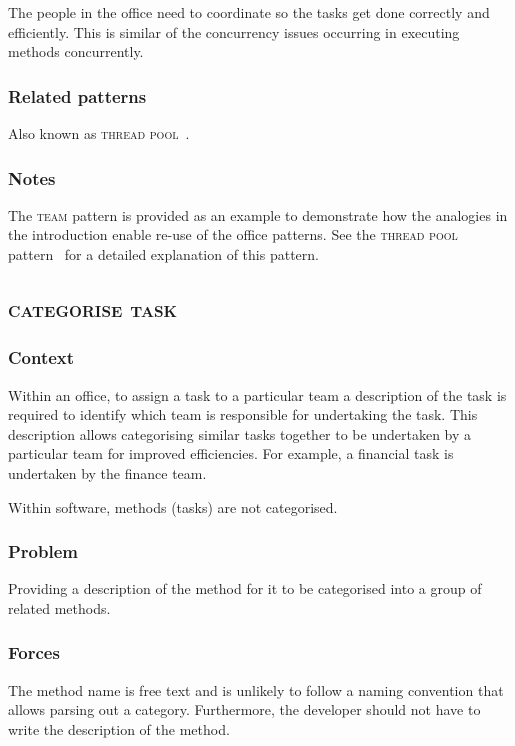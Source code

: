 \documentclass[prodmode]{style/acmlarge}
\begin{document}
The people in the office need to coordinate so the tasks get done correctly and
efficiently.  This is similar of the concurrency issues occurring in executing
methods concurrently.

\subsubsection*{Related patterns} Also known as \textsc{thread pool}~\cite{thread-per-request}.

\subsubsection*{Notes} The \textsc{team} pattern is provided as an example to
demonstrate how the analogies in the introduction enable re-use of the office
patterns. See the \textsc{thread pool} pattern~\cite{thread-per-request} for a
detailed explanation of this pattern.



\subsection{\textsc{\textbf{categorise task}}}

\subsubsection*{Context} Within an office, to assign a task to a particular team
a description of the task is required to identify which team is responsible for
undertaking the task.  This description allows categorising similar tasks
together to be undertaken by a particular team for improved efficiencies.  For
example, a financial task is undertaken by the finance team.

Within software, methods (tasks) are not categorised.

\subsubsection*{\textbf{Problem}} Providing a description of the method for it to be
categorised into a group of related methods.

\subsubsection*{Forces} The method name is free text and is unlikely to follow a
naming convention that allows parsing out a category.  Furthermore, the
developer should not have to write the description of the method.
\end{document}

